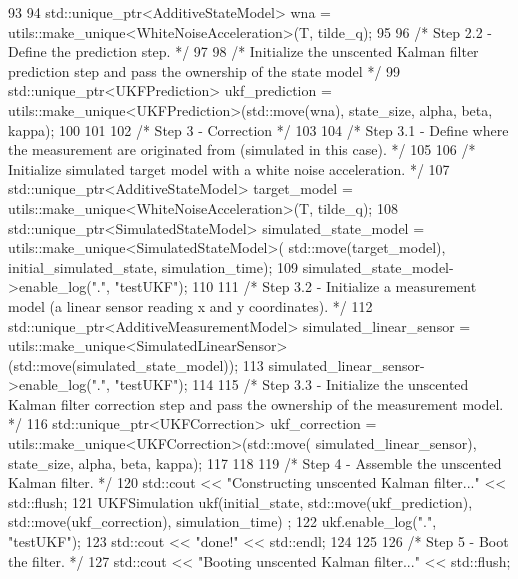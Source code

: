 \begin{DoxyCodeInclude}
93 
94     std::unique\_ptr<AdditiveStateModel> wna = utils::make\_unique<WhiteNoiseAcceleration>(T, tilde\_q);
95 
96     \textcolor{comment}{/* Step 2.2 - Define the prediction step. */}
97 
98     \textcolor{comment}{/* Initialize the unscented Kalman filter prediction step and pass the ownership of the state model */}
99     std::unique\_ptr<UKFPrediction> ukf\_prediction = utils::make\_unique<UKFPrediction>(std::move(wna), 
      state\_size, alpha, beta, kappa);
100 
101 
102     \textcolor{comment}{/* Step 3 - Correction */}
103 
104     \textcolor{comment}{/* Step 3.1 - Define where the measurement are originated from (simulated in this case). */}
105 
106     \textcolor{comment}{/* Initialize simulated target model with a white noise acceleration. */}
107     std::unique\_ptr<AdditiveStateModel> target\_model = utils::make\_unique<WhiteNoiseAcceleration>(T, 
      tilde\_q);
108     std::unique\_ptr<SimulatedStateModel> simulated\_state\_model = utils::make\_unique<SimulatedStateModel>(
      std::move(target\_model), initial\_simulated\_state, simulation\_time);
109     simulated\_state\_model->enable\_log(\textcolor{stringliteral}{"."}, \textcolor{stringliteral}{"testUKF"});
110 
111     \textcolor{comment}{/* Step 3.2 - Initialize a measurement model (a linear sensor reading x and y coordinates). */}
112     std::unique\_ptr<AdditiveMeasurementModel> simulated\_linear\_sensor = 
      utils::make\_unique<SimulatedLinearSensor>(std::move(simulated\_state\_model));
113     simulated\_linear\_sensor->enable\_log(\textcolor{stringliteral}{"."}, \textcolor{stringliteral}{"testUKF"});
114 
115     \textcolor{comment}{/* Step 3.3 - Initialize the unscented Kalman filter correction step and pass the ownership of the
       measurement model. */}
116     std::unique\_ptr<UKFCorrection> ukf\_correction = utils::make\_unique<UKFCorrection>(std::move(
      simulated\_linear\_sensor), state\_size, alpha, beta, kappa);
117 
118 
119     \textcolor{comment}{/* Step 4 - Assemble the unscented Kalman filter. */}
120     std::cout << \textcolor{stringliteral}{"Constructing unscented Kalman filter..."} << std::flush;
121     UKFSimulation ukf(initial\_state, std::move(ukf\_prediction), std::move(ukf\_correction), simulation\_time)
      ;
122     ukf.enable\_log(\textcolor{stringliteral}{"."}, \textcolor{stringliteral}{"testUKF"});
123     std::cout << \textcolor{stringliteral}{"done!"} << std::endl;
124 
125 
126     \textcolor{comment}{/* Step 5 - Boot the filter. */}
127     std::cout << \textcolor{stringliteral}{"Booting unscented Kalman filter..."} << std::flush;

\end{DoxyCodeInclude}
